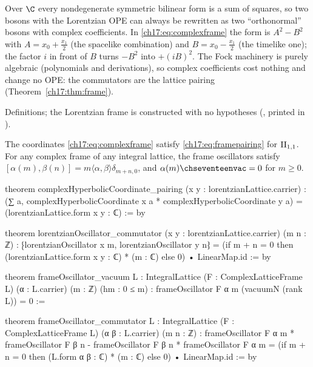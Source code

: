 \begin{physics}
Over $\C$ every nondegenerate symmetric bilinear form is a sum of squares, so two bosons with the Lorentzian
OPE can always be rewritten as two ``orthonormal'' bosons with complex coefficients.  In
\eqref{ch17:eq:complexframe} the form is $A^2-B^2$ with $A=x_0+\frac{x_1}2$ (the spacelike combination) and
$B=x_0-\frac{x_1}2$ (the timelike one); the factor $i$ in front of $B$ turns $-B^2$ into $+(iB)^2$.  The Fock
machinery is purely algebraic (polynomials and derivations), so complex coefficients cost nothing and change no
OPE: the commutators are the lattice pairing (Theorem~\ref{ch17:thm:frame}).
\end{physics}

\begin{status}
Definitions; the Lorentzian frame is constructed with no hypotheses
(, printed in ).
\end{status}

\begin{theorem}\label{ch17:thm:frame}
The coordinates \eqref{ch17:eq:complexframe} satisfy \eqref{ch17:eq:framepairing} for ${\mathrm{II}_{1,1}}$.  For any
complex frame of any integral lattice, the frame oscillators satisfy
$[\alpha(m),\beta(n)]=m\langle\alpha,\beta\rangle\delta_{m+n,0}$, and $\alpha(m)\chseventeenvac=0$ for $m\ge0$.
\end{theorem}

\begin{leancode}
theorem complexHyperbolicCoordinate_pairing (x y : lorentzianLattice.carrier) :
    (∑ a, complexHyperbolicCoordinate x a * complexHyperbolicCoordinate y a) =
      (lorentzianLattice.form x y : ℂ) := by

theorem lorentzianOscillator_commutator (x y : lorentzianLattice.carrier) (m n : ℤ) :
    ⁅lorentzianOscillator x m, lorentzianOscillator y n⁆ =
      (if m + n = 0 then (lorentzianLattice.form x y : ℂ) * (m : ℂ) else 0) •
        LinearMap.id := by

theorem frameOscillator_vacuum {L : IntegralLattice} (F : ComplexLatticeFrame L)
    (α : L.carrier) (m : ℤ) (hm : 0 ≤ m) :
    frameOscillator F α m (vacuumN (rank L)) = 0 :=

theorem frameOscillator_commutator {L : IntegralLattice} (F : ComplexLatticeFrame L)
    (α β : L.carrier) (m n : ℤ) :
    frameOscillator F α m * frameOscillator F β n -
      frameOscillator F β n * frameOscillator F α m =
      (if m + n = 0 then (L.form α β : ℂ) * (m : ℂ) else 0) • LinearMap.id := by
\end{leancode}

